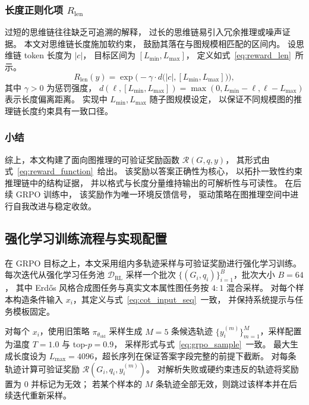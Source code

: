 \subsubsection{长度正则化项 $R_{\mathrm{len}}$}
\label{subsubsec:reward_len}

过短的思维链往往缺乏可追溯的解释，
过长的思维链易引入冗余推理或噪声证据。
本文对思维链长度施加软约束，
鼓励其落在与图规模相匹配的区间内。
设思维链 token 长度为 $|c|$，
目标区间为 $[L_{\min},L_{\max}]$，
定义如式~\ref{eq:reward_len}\ 所示。
\begin{equation}
  R_{\mathrm{len}}(y)
  =
  \exp\Big(
    -\gamma \cdot d\big(|c|,[L_{\min},L_{\max}]\big)
  \Big),
  \label{eq:reward_len}
\end{equation}
其中 $\gamma>0$ 为惩罚强度，
$d(\ell,[L_{\min},L_{\max}])=\max(0,L_{\min}-\ell,\ell-L_{\max})$ 表示长度偏离距离。
实现中 $L_{\min},L_{\max}$ 随子图规模设定，
以保证不同规模图的推理链长度约束具有一致口径。

\subsubsection{小结}
\label{subsubsec:reward_summary}

综上，本文构建了面向图推理的可验证奖励函数 $\mathcal{R}(G,q,y)$，
其形式由式~\ref{eq:reward_function}\ 给出。
该奖励以答案正确性为核心，
以拓扑一致性约束推理链中的结构证据，
并以格式与长度分量维持输出的可解析性与可读性。
在后续 GRPO 训练中，
该奖励作为唯一环境反馈信号，
驱动策略在图推理空间中进行自我改进与稳定收敛。


\subsection{强化学习训练流程与实现配置}
\label{subsec:grpo_train_detail}

在 GRPO 目标之上，本文采用组内多轨迹采样与可验证奖励进行强化学习训练。
每次迭代从强化学习任务池 $\mathcal{D}_{\mathrm{RL}}$ 采样一个批次
$\{(G_i,q_i)\}_{i=1}^{B}$，批次大小 $B=64$，
其中 Erd\H{o}s\cite{Guo2025G1TL}  风格合成图任务与真实文本属性图任务按 $4{:}1$ 混合采样。
对每个样本构造条件输入 $x_i$，其定义与式~\ref{eq:cot_input_seq}\ 一致，
并保持系统提示与任务模板固定。

对每个 $x_i$，使用旧策略 $\pi_{\theta_{\mathrm{old}}}$ 采样生成 $M=5$ 条候选轨迹
$\{y_i^{(m)}\}_{m=1}^{M}$，采样配置为温度 $T=1.0$ 与 top-$p=0.9$，
采样形式与式~\ref{eq:grpo_sample}\ 一致。
最大生成长度设为 $L_{\max}=4096$，超长序列在保证答案字段完整的前提下截断。
对每条轨迹计算可验证奖励 $\mathcal{R}(G_i,q_i,y_i^{(m)})$。
对解析失败或硬约束违反的轨迹将奖励置为 $0$ 并标记为无效；
若某个样本的 $M$ 条轨迹全部无效，则跳过该样本并在后续迭代重新采样。

